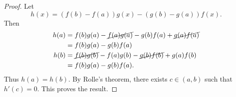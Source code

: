 \begin{proof}
    Let \[
        h(x) = (f(b) - f(a))g(x) - (g(b) - g(a))f(x).
    \] Then \begin{align*}
        h(a) &= f(b) g(a) - \cancel{f(a) g(a)}
                - g(b) f(a) + \cancel{g(a) f(a)} \\
             &= f(b) g(a) - g(b) f(a) \\
        h(b) &= \cancel{f(b) g(b)} - f(a) g(b)
                - \cancel{g(b) f(b)} + g(a) f(b) \\
             &= f(b) g(a) - g(b) f(a).
    \end{align*}
    Thus $h(a) = h(b)$.
    By Rolle's theorem, there exists $c \in (a, b)$ such that $h'(c) = 0$.
    This proves the result.
\end{proof}

